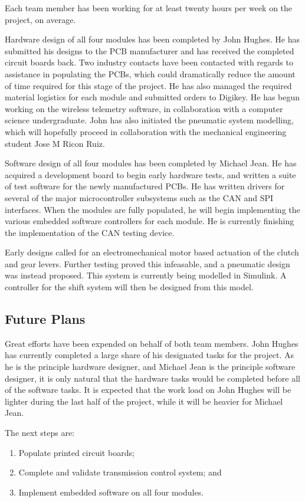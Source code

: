 \documentclass[12pt]{report}
\begin{document}
  Each team member has been working for at least twenty hours per week on the project, on average.

  Hardware design of all four modules has been completed by John Hughes. He has submitted his designs to the PCB manufacturer and has received the completed circuit boards back. Two industry contacts have been contacted with regards to assistance in populating the PCBs, which could dramatically reduce the amount of time required for this stage of the project. He has also managed the required material logistics for each module and submitted orders to Digikey. He has begun working on the wireless telemetry software, in collaboration with a computer science undergraduate. John has also initiated the pneumatic system modelling, which will hopefully proceed in collaboration with the mechanical engineering student Jose M Ricon Ruiz.

  Software design of all four modules has been completed by Michael Jean. He has acquired a development board to begin early hardware tests, and written a suite of test software for the newly manufactured PCBs. He has written drivers for several of the major microcontroller subsystems such as the CAN and SPI interfaces. When the modules are fully populated, he will begin implementing the various embedded software controllers for each module. He is currently finishing the implementation of the CAN testing device.

  Early designs called for an electromechanical motor based actuation of the clutch and gear levers. Further testing proved this infeasable, and a pneumatic design was instead proposed. This system is currently being modelled in Simulink. A controller for the shift system will then be designed from this model.

  \subsection{Future Plans}

  Great efforts have been expended on behalf of both team members. John Hughes has currently completed a large share of his designated tasks for the project. As he is the principle hardware designer, and Michael Jean is the principle software designer, it is only natural that the hardware tasks would be completed before all of the software tasks. It is expected that the work load on John Hughes will be lighter during the last half of the project, while it will be heavier for Michael Jean.

  The next steps are:
  \begin{enumerate}
  \item Populate printed circuit boards;
  \item Complete and validate transmission control system; and
  \item Implement embedded software on all four modules.
  \end{enumerate}
\end{document}
